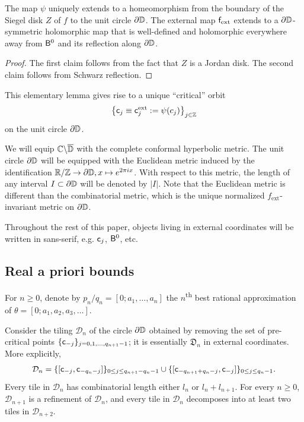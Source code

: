 \documentclass{amsart}
\begin{document}
\begin{lemma}
    The map $\psi$ uniquely extends to a homeomorphism from the boundary of the Siegel disk $Z$ of $f$ to the unit circle $\partial \mathbb{D}$. 
    The external map $\mathsf{f}_{\textnormal{ext}}$ extends to a $\partial \mathbb{D}$-symmetric holomorphic map that is well-defined and holomorphic everywhere away from $\mathsf{B}^0$ and its reflection along $\partial \mathbb{D}$.
\end{lemma}

\begin{proof}
    The first claim follows from the fact that $Z$ is a Jordan disk.
    The second claim follows from Schwarz reflection.
\end{proof}

This elementary lemma gives rise to a unique ``critical'' orbit 
\[
    \left\{ \mathsf{c}_j \equiv \mathsf{c}_j^{\textnormal{ext}} := \psi(c_j) \right\}_{j \in \mathbb{Z}}
\]
on the unit circle $\partial \mathbb{D}$.

We will equip $\mathbb{C} \backslash \overline{\mathbb{D}}$ with the complete conformal hyperbolic metric. 
The unit circle $\partial \mathbb{D}$ will be equipped with the Euclidean metric induced by the identification $\mathbb{R}/\mathbb{Z} \to \partial \mathbb{D}, x \mapsto e^{2\pi i x}$. 
With respect to this metric, the length of any interval $I \subset \partial \mathbb{D}$ will be denoted by $|I|$. Note that the Euclidean metric is different than the combinatorial metric, which is the unique normalized $f_{\text{ext}}$-invariant metric on $\partial \mathbb{D}$.

Throughout the rest of this paper, objects living in external coordinates will be written in sans-serif, e.g. $\mathsf{c}_j$, $\mathsf{B}^0$, etc.


\subsection{Real a priori bounds}
\label{ss:real-bounds}

For $n \geq 0$, denote by $p_n/q_n = [0;a_1,\ldots,a_n]$ the $n$\textsuperscript{th} best rational approximation of $\theta = [0;a_1,a_2,a_3,\ldots]$. 

Consider the tiling $\mathcal{D}_n$ of the circle $\partial \mathbb{D}$ obtained by removing the set of pre-critical points $\{\mathsf{c}_{-j}\}_{j=0,1,\ldots ,q_{n+1}-1}$; it is essentially $\mathfrak{D}_n$ in external coordinates.
More explicitly,
\[
    \mathcal{D}_n = \{ [\mathsf{c}_{-j}, \mathsf{c}_{-q_n-j}]\}_{0\leq j \leq q_{n+1}-q_{n}-1} \cup \{ [\mathsf{c}_{-q_{n+1}+q_n-j}, \mathsf{c}_{-j}]\}_{0\leq j \leq q_n-1}.
\]
Every tile in $\mathcal{D}_n$ has combinatorial length either $l_n$ or $l_n + l_{n+1}$.
For every $n\geq 0$, $\mathcal{D}_{n+1}$ is a refinement of $\mathcal{D}_n$, and every tile in $\mathcal{D}_n$ decomposes into at least two tiles in $\mathcal{D}_{n+2}$.
\end{document}
